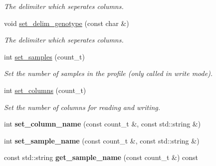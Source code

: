 \begin{DoxyCompactItemize}
\begin{DoxyCompactList}\small\item\em The delimiter which seperates columns. \end{DoxyCompactList}\item 
\hypertarget{classmap__file_a64d70579b05c3e7882b8adde9136da19}{void \hyperlink{classmap__file_a64d70579b05c3e7882b8adde9136da19}{set\-\_\-delim\-\_\-genotype} (const char \&)}\label{classmap__file_a64d70579b05c3e7882b8adde9136da19}

\begin{DoxyCompactList}\small\item\em The delimiter which seperates columns. \end{DoxyCompactList}\item 
\hypertarget{classmap__file_a3a5a459b41ee48e735170ff99c6f2561}{int \hyperlink{classmap__file_a3a5a459b41ee48e735170ff99c6f2561}{set\-\_\-samples} (count\-\_\-t)}\label{classmap__file_a3a5a459b41ee48e735170ff99c6f2561}

\begin{DoxyCompactList}\small\item\em Set the number of samples in the profile (only called in write mode). \end{DoxyCompactList}\item 
\hypertarget{classmap__file_accb3bc2c0b49e2ac5e4bab66ecf2c031}{int \hyperlink{classmap__file_accb3bc2c0b49e2ac5e4bab66ecf2c031}{set\-\_\-columns} (count\-\_\-t)}\label{classmap__file_accb3bc2c0b49e2ac5e4bab66ecf2c031}

\begin{DoxyCompactList}\small\item\em Set the number of columns for reading and writing. \end{DoxyCompactList}\item 
\hypertarget{classmap__file_af978940e8a2d40b14a4b307bcc5bc2b8}{int {\bfseries set\-\_\-column\-\_\-name} (const count\-\_\-t \&, const std\-::string \&)}\label{classmap__file_af978940e8a2d40b14a4b307bcc5bc2b8}

\item 
\hypertarget{classmap__file_a69d5dbe614580fc358eb6747a49fccf7}{int {\bfseries set\-\_\-sample\-\_\-name} (const count\-\_\-t \&, const std\-::string \&)}\label{classmap__file_a69d5dbe614580fc358eb6747a49fccf7}

\item 
\hypertarget{classmap__file_aa771050a165bc3b4d14e7d87027a5353}{const std\-::string {\bfseries get\-\_\-sample\-\_\-name} (const count\-\_\-t \&) const }\label{classmap__file_aa771050a165bc3b4d14e7d87027a5353}


\end{DoxyCompactItemize}
